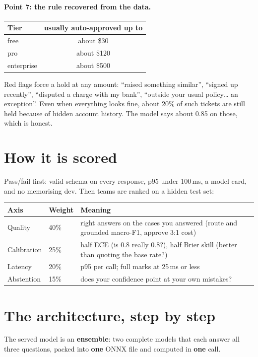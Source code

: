 \documentclass[11pt,a4paper]{article}
\begin{document}
\paragraph{Point 7: the rule recovered from the data.}
\begin{center}
\begin{tabular}{lc}
\toprule
Tier & usually auto-approved up to \\
\midrule
free & about \$30 \\
pro & about \$120 \\
enterprise & about \$500 \\
\bottomrule
\end{tabular}
\end{center}
Red flags force a hold at any amount: ``raised something similar'', ``signed up
recently'', ``disputed a charge with my bank'', ``outside your usual policy\ldots{} an
exception''. Even when everything looks fine, about 20\% of such tickets are still held
because of hidden account history. The model says about 0.85 on those, which is honest.

\section{How it is scored}
Pass/fail first: valid schema on every response, p95 under 100\,ms, a model card, and no
memorising dev. Then teams are ranked on a hidden test set:

\medskip
\noindent\begin{tabularx}{\linewidth}{@{}llL@{}}
\toprule
Axis & Weight & Meaning \\
\midrule
Quality & 40\% & right answers on the cases you answered (route and grounded macro-F1, approve 3:1 cost) \\
Calibration & 25\% & half ECE (is 0.8 really 0.8?), half Brier skill (better than quoting the base rate?) \\
Latency & 20\% & p95 per call; full marks at 25\,ms or less \\
Abstention & 15\% & does your confidence point at your own mistakes? \\
\bottomrule
\end{tabularx}

\section{The architecture, step by step}
The served model is an \textbf{ensemble}: two complete models that each answer all three
questions, packed into \textbf{one} ONNX file and computed in \textbf{one} call.
\end{document}
